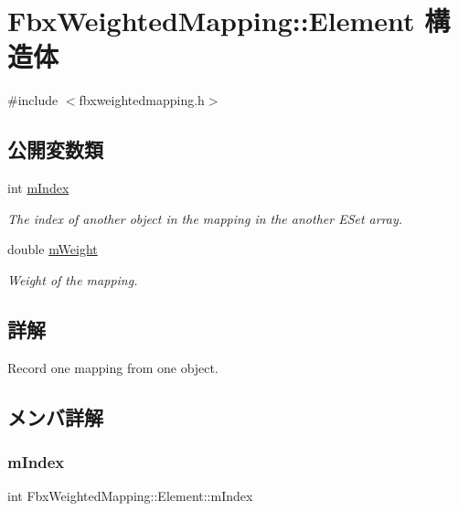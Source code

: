\hypertarget{struct_fbx_weighted_mapping_1_1_element}{}\section{Fbx\+Weighted\+Mapping\+:\+:Element 構造体}
\label{struct_fbx_weighted_mapping_1_1_element}


{\ttfamily \#include $<$fbxweightedmapping.\+h$>$}

\subsection*{公開変数類}
\begin{DoxyCompactItemize}
\item 
int \hyperlink{struct_fbx_weighted_mapping_1_1_element_a7ae86aad8539b57b926ac5c5c56c5a04}{m\+Index}
\begin{DoxyCompactList}\small\item\em The index of another object in the mapping in the another E\+Set array. \end{DoxyCompactList}\item 
double \hyperlink{struct_fbx_weighted_mapping_1_1_element_aa078b1f7b0a995f487530342dc9b0038}{m\+Weight}
\begin{DoxyCompactList}\small\item\em Weight of the mapping. \end{DoxyCompactList}\end{DoxyCompactItemize}


\subsection{詳解}
Record one mapping from one object. 

\subsection{メンバ詳解}
\mbox{\label{struct_fbx_weighted_mapping_1_1_element_a7ae86aad8539b57b926ac5c5c56c5a04}} 
\subsubsection{\texorpdfstring{m\+Index}{mIndex}}
{\footnotesize\ttfamily int Fbx\+Weighted\+Mapping\+::\+Element\+::m\+Index}



